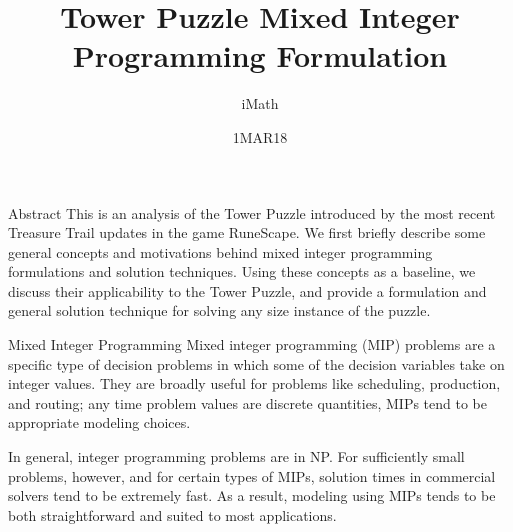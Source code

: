 \documentclass[12pt]{article}
\begin{document}
 
 
\title{Tower Puzzle Mixed Integer Programming Formulation}
\author{iMath}
\date{1MAR18}
\maketitle
 
\begin{section}{Abstract}
This is an analysis of the Tower Puzzle introduced by the most recent Treasure Trail updates in the game RuneScape. We first briefly describe some general concepts and motivations behind mixed integer programming formulations and solution techniques. Using these concepts as a baseline, we discuss their applicability to the Tower Puzzle, and provide a formulation and general solution technique for solving any size instance of the puzzle.
\end{section}
 
\begin{section}{Mixed Integer Programming}
Mixed integer programming (MIP) problems are a specific type of decision problems in which some of the decision variables take on integer values. They are broadly useful for problems like scheduling, production, and routing; any time problem values are discrete quantities, MIPs tend to be appropriate modeling choices.

In general, integer programming problems are in NP. For sufficiently small problems, however, and for certain types of MIPs, solution times in commercial solvers tend to be extremely fast. As a result, modeling using MIPs tends to be both straightforward and suited to most applications.
\end{section}
\end{document}
